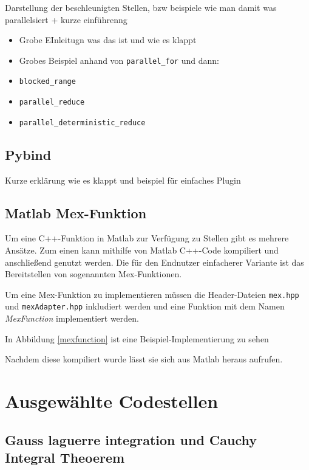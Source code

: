Darstellung der beschleunigten Stellen, bzw beispiele wie man damit was parallelsiert + kurze einführenng

\begin{itemize}
    \item Grobe EInleitugn was das ist und wie es klappt
    \item Grobes Beispiel anhand von \texttt{parallel\_for} und dann:
    \item \texttt{blocked\_range}
    \item \texttt{parallel\_reduce}
    \item \texttt{parallel\_deterministic\_reduce}
\end{itemize}

\subsection{Pybind}

Kurze erklärung wie es klappt und beispiel für einfaches Plugin

\subsection{Matlab Mex-Funktion}

Um eine C++-Funktion in Matlab zur Verfügung zu Stellen gibt es mehrere Ansätze.
Zum einen kann mithilfe von Matlab C++-Code kompiliert und anschließend genutzt werden. 
Die für den Endnutzer einfacherer Variante ist das Bereitstellen von sogenannten Mex-Funktionen.

Um eine Mex-Funktion zu implementieren müssen die Header-Dateien \texttt{mex.hpp} und \texttt{mexAdapter.hpp} inkludiert werden
und eine Funktion mit dem Namen \textit{MexFunction} implementiert werden. 

In Abbildung \ref{mexfunction} ist eine Beispiel-Implementierung zu sehen 
\begin{center}
    
    \label{mexfunction}
\end{center}

Nachdem diese kompiliert wurde lässt sie sich aus Matlab heraus aufrufen.

\section{Ausgewählte Codestellen}

\subsection{Gauss laguerre integration und Cauchy Integral Theoerem}

